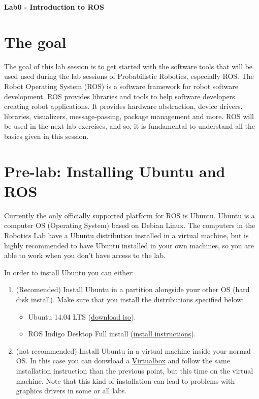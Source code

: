 \documentclass[a4paper,10pt]{article}
\begin{document}
\marginsize{2cm}{2cm}{2cm}{2cm}

\begin{center}
\Large \textbf{Lab0 - Introduction to ROS}
\end{center}

\section{The goal}

The goal of this lab session is to get started with the software tools that will be used used during the lab sessions of Probabilistic Robotics, especially ROS. The Robot Operating System (ROS) is a software framework for robot software development. ROS provides libraries and tools to help software developers creating robot applications. It provides hardware abstraction, device drivers, libraries, visualizers, message-passing, package management and more. ROS will be used in the next lab exercises, and so, it is fundamental to understand all the basics given in this session. 

\section{Pre-lab: Installing Ubuntu and ROS}

Currently the only officially supported platform for ROS is Ubuntu. Ubuntu is a computer OS (Operating System) based on Debian Linux. The computers in the Robotics Lab have a Ubuntu distribution installed in a virtual machine, but is highly recommended to have Ubuntu installed in your own machines, so you are able to work when you don't have access to the lab.

In order to install Ubuntu you can either:

\begin{enumerate}
    \item (Recomended) Install Ubuntu in a partition alongside your other OS (hard disk install). Make sure that you install the distributions specified below:
    \begin{itemize}
        \item Ubuntu 14.04 LTS (\href{http://releases.ubuntu.com/14.04/ubuntu-14.04.3-desktop-amd64.iso}{download iso}).
        \item ROS Indigo Desktop Full install (\href{http://wiki.ros.org/hydro/Installation/Ubuntu}{install instructions}).
    \end{itemize}
    
    \item (not recommended) Install Ubuntu in a virtual machine inside your normal OS. In this case you can donwload a \href{https://www.virtualbox.org/wiki/Linux_Downloads}{Virtualbox}  and follow the same installation instruction than the previous point, but this time on the virtual machine. Note that this kind of installation can lead to problems with graphics drivers in some or all labs.
\end{enumerate}
\end{document}
